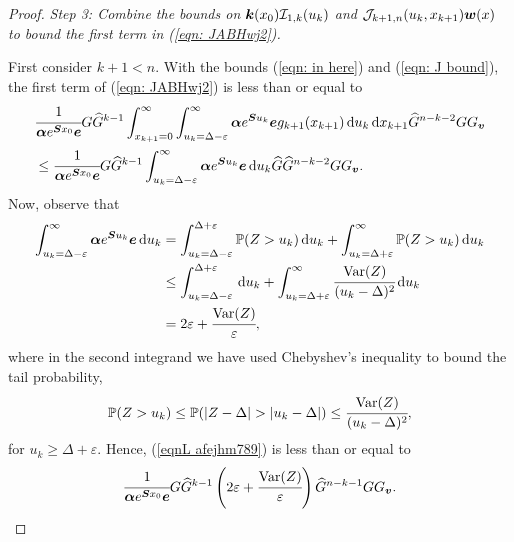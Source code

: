 \begin{proof}
\emph{Step 3: Combine the bounds on \(\boldsymbol k(x_0)\mathcal I_{1,k}(u_k) \) and \(\mathcal J_{k+1,n}(u_k,x_{k+1})  {\boldsymbol w}(x)\) to bound the first term in (\ref{eqn: JABHwj2}).}	

		First consider \(k+1<n\). With the bounds (\ref{eqn: in here}) and (\ref{eqn: J bound}), the first term of (\ref{eqn: JABHwj2}) is less than or equal to 
		\begin{align}
			&\cfrac{1}{\boldsymbol \alpha e^{\boldsymbol{S} x_0 }\boldsymbol e}G \widehat G^{k-1}
			\int_{x_{k+1}=0}^\infty \int_{u_k=\Delta-\varepsilon}^\infty \boldsymbol \alpha e^{\boldsymbol{S}u_k}\boldsymbol e g_{k+1}(x_{k+1}) \, \mathrm{d} u_k \, \mathrm{d} x_{k+1}\widehat G^{n-k-2} G G_{\boldsymbol v}\nonumber 
			\\&\leq \cfrac{1}{\boldsymbol \alpha e^{\boldsymbol{S} x_0}\boldsymbol e}G \widehat G^{k-1}  
			\int_{u_k=\Delta-\varepsilon}^\infty \boldsymbol \alpha e^{\boldsymbol{S}u_k}\boldsymbol e \, \mathrm{d} u_k \widehat G \widehat G^{n-k-2} G G_{\boldsymbol v}. \label{eqnL afejhm789}
		\end{align}
		Now, observe that 
		\begin{align}
			\int_{u_k=\Delta-\varepsilon}^\infty \boldsymbol \alpha e^{\boldsymbol{S}u_k}\boldsymbol e \, \mathrm{d} u_k &= \int_{u_k=\Delta-\varepsilon}^{\Delta+\varepsilon} \mathbb P(Z> u_k) \, \mathrm{d} u_k + \int_{u_k=\Delta+\varepsilon}^\infty \mathbb P(Z> u_k) \, \mathrm{d} u_k\nonumber
			\\&\leq \int_{u_k=\Delta-\varepsilon}^{\Delta+\varepsilon} \, \mathrm{d} u_k + \int_{u_k=\Delta+\varepsilon}^\infty \cfrac{\mathrm{Var}(Z)}{(u_k-\Delta)^2} \, \mathrm{d} u_k\nonumber
			\\&= 2\varepsilon + \cfrac{\mathrm{Var}(Z)}{\varepsilon},\label{eqn:kdjf55}
		\end{align}
		where in the second integrand we have used Chebyshev's inequality to bound the tail probability, 
		\[\mathbb P(Z> u_k) \leq \mathbb P(|Z-\Delta|> |u_k-\Delta|) \leq \cfrac{\var(Z)}{(u_k-\Delta)^2},\]
		for \(u_k \geq \Delta +\varepsilon\). Hence, (\ref{eqnL afejhm789}) is less than or equal to 
		\[\cfrac{1}{\boldsymbol \alpha e^{\boldsymbol{S} x_0}\boldsymbol e}G \widehat G^{k-1}  
			\left(2\varepsilon + \cfrac{\mathrm{Var}(Z)}{\varepsilon}\right) \widehat G^{n-k-1} G G_{\boldsymbol v}.\]
		

\end{proof}
